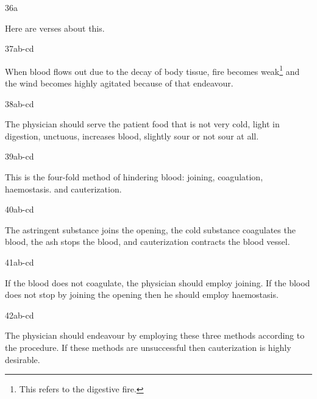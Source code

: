 \begin{translation}
\item[36a]

Here are verses about this.

\item[37ab-cd]

\begin{sloka}
When blood flows out due to the decay of body tissue, fire becomes weak\footnote{This refers to the digestive fire.} and the wind becomes highly agitated because of that endeavour.
\end{sloka}

\item[38ab-cd]

\begin{sloka}
The physician should serve the patient food that is not very cold, light in digestion, unctuous, increases blood, slightly sour or not sour at all. 
\end{sloka}

\item[39ab-cd]

\begin{sloka}
This is the four-fold method of hindering blood: joining, coagulation, 
haemostasis.
and cauterization.  
\end{sloka}

\item[40ab-cd]

\begin{sloka}
The astringent substance joins the opening, the cold substance coagulates the blood, the ash stops the blood, and cauterization contracts the blood vessel.
\end{sloka}

\item[41ab-cd]

\begin{sloka}
If the blood does not coagulate, the physician should employ joining. If the blood does not stop by joining the opening then he should employ haemostasis.
\end{sloka}

\item[42ab-cd]

\begin{sloka}
The physician should endeavour by employing these three methods according to the procedure. If these methods are unsuccessful then cauterization is highly desirable.
\end{sloka}


\end{translation}

